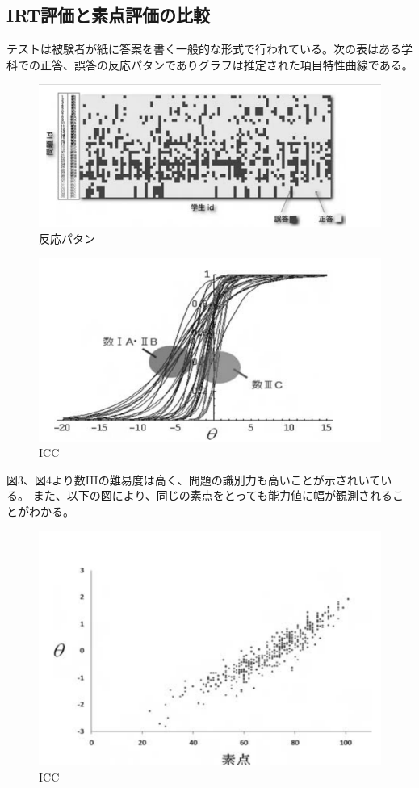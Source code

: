 \documentclass[12pt]{jarticle}
\begin{document}
\subsection{IRT評価と素点評価の比較}
テストは被験者が紙に答案を書く一般的な形式で行われている。次の表はある学科での正答、誤答の反応パタンでありグラフは推定された項目特性曲線である。
\begin{figure}[H]
  \includegraphics[bb = -230 300 1 1,scale = 0.5]{02.png}
  \vspace{4.5cm}
  \caption{反応パタン}
\end{figure}
\begin{figure}[H]
  \includegraphics[bb = -230 300 1 1,scale = 0.5]{03.png}
  \vspace{4.8cm}
  \caption{ICC}
\end{figure}
図$3$、図$4$より数IIIの難易度は高く、問題の識別力も高いことが示されいている。
また、以下の図により、同じの素点をとっても能力値に幅が観測されることがわかる。
\begin{figure}[H]
  \includegraphics[bb = -200 300 1 1,scale = 0.5]{04.png}
  \vspace{4.8cm}
  \caption{ICC}
\end{figure}
\end{document}
